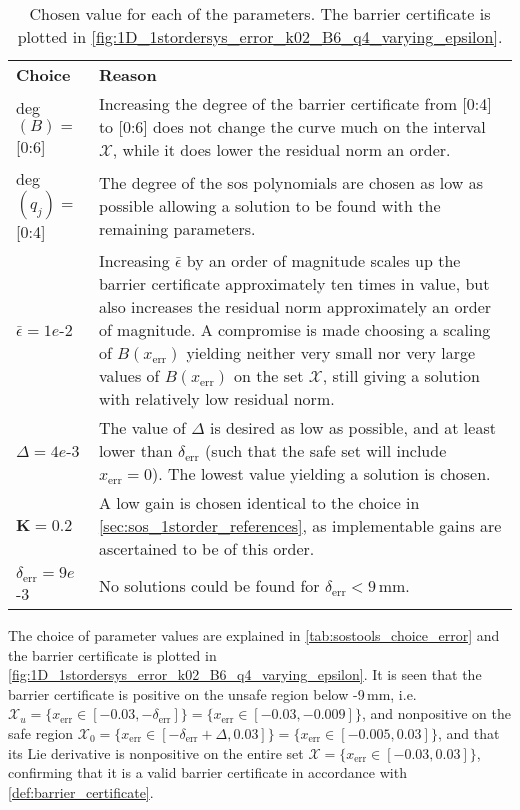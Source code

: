 
\begin{table}[htbp]
\begin{tabularx}{\textwidth}{l X}
		\rowcolor{HeaderBlue}
		\textbf{Choice} & \textbf{Reason}\\
		deg$(B)=$ [0:6] & Increasing the degree of the barrier certificate from [0:4] to [0:6] does not change the curve much on the interval $\mathcal{X}$, while it does lower the residual norm an order.\\
		\rowcolor{textBlue}
		deg$(q_j)=$ [0:4] & The degree of the \gls{sos} polynomials are chosen as low as possible allowing a solution to be found with the remaining parameters.\\
		$\bar{\epsilon}=1e$-2 & Increasing  $\bar{\epsilon}$ by an order of magnitude scales up the barrier certificate approximately ten times in value, but also increases  the residual norm approximately an order of magnitude. A compromise is made choosing a scaling of $B(x_\text{err})$ yielding neither very small nor very large values of $B(x_\text{err})$ on the set $\mathcal{X}$, still giving a solution with relatively low residual norm. \\
		\rowcolor{textBlue}
		$\Delta=4e$-3 & The value of $\Delta$ is desired as low as possible, and at least lower than $\delta_\text{err}$ (such that the safe set will include $x_\text{err}=0$). The lowest value yielding a solution is chosen.\\
		$\textbf{K}=0.2$ & A low gain is chosen identical to the choice in \autoref{sec:sos_1storder_references}, as implementable gains are ascertained to be of this order.\\
		\rowcolor{textBlue}
		$\delta_\text{err}=9e$-3 & No solutions could be found for $\delta_\text{err}<9$\,mm.
\end{tabularx}
\caption{Chosen value for each of the parameters. The barrier certificate is plotted in \autoref{fig:1D_1stordersys_error_k02_B6_q4_varying_epsilon}. %
	}
\label{tab:sostools_choice_error}
\end{table}

The choice of parameter values are explained in \autoref{tab:sostools_choice_error} and the barrier certificate is plotted in \autoref{fig:1D_1stordersys_error_k02_B6_q4_varying_epsilon}. %
It is seen that the barrier certificate is positive on the unsafe region below -9\,mm, i.e.  $\mathcal{X}_u=\{x_\text{err}\in[-0.03,-\delta_\text{err}]\}=\{x_\text{err}\in[-0.03,-0.009]\}$, and nonpositive on the safe region $\mathcal{X}_0=\{x_\text{err}\in[-\delta_\text{err}+\Delta,0.03]\}=\{x_\text{err}\in[-0.005,0.03]\}$, and that its Lie derivative is nonpositive on the entire set $\mathcal{X}=\{x_\text{err} \in[-0.03,0.03] \}$, confirming that it is a valid barrier certificate in accordance with \autoref{def:barrier_certificate}.

